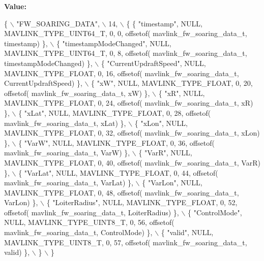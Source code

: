 {\bfseries Value\+:}
\begin{DoxyCode}
\{ \(\backslash\)
    \textcolor{stringliteral}{"FW\_SOARING\_DATA"}, \(\backslash\)
    14, \(\backslash\)
    \{  \{ \textcolor{stringliteral}{"timestamp"}, NULL, MAVLINK_TYPE_UINT64_T, 0, 0, offsetof(
      mavlink_fw_soaring_data_t, timestamp) \}, \(\backslash\)
         \{ \textcolor{stringliteral}{"timestampModeChanged"}, NULL, MAVLINK_TYPE_UINT64_T, 0, 8, offsetof(
      mavlink_fw_soaring_data_t, timestampModeChanged) \}, \(\backslash\)
         \{ \textcolor{stringliteral}{"CurrentUpdraftSpeed"}, NULL, MAVLINK_TYPE_FLOAT, 0, 16, offsetof(
      mavlink_fw_soaring_data_t, CurrentUpdraftSpeed) \}, \(\backslash\)
         \{ \textcolor{stringliteral}{"xW"}, NULL, MAVLINK_TYPE_FLOAT, 0, 20, offsetof(
      mavlink_fw_soaring_data_t, xW) \}, \(\backslash\)
         \{ \textcolor{stringliteral}{"xR"}, NULL, MAVLINK_TYPE_FLOAT, 0, 24, offsetof(
      mavlink_fw_soaring_data_t, xR) \}, \(\backslash\)
         \{ \textcolor{stringliteral}{"xLat"}, NULL, MAVLINK_TYPE_FLOAT, 0, 28, offsetof(
      mavlink_fw_soaring_data_t, xLat) \}, \(\backslash\)
         \{ \textcolor{stringliteral}{"xLon"}, NULL, MAVLINK_TYPE_FLOAT, 0, 32, offsetof(
      mavlink_fw_soaring_data_t, xLon) \}, \(\backslash\)
         \{ \textcolor{stringliteral}{"VarW"}, NULL, MAVLINK_TYPE_FLOAT, 0, 36, offsetof(
      mavlink_fw_soaring_data_t, VarW) \}, \(\backslash\)
         \{ \textcolor{stringliteral}{"VarR"}, NULL, MAVLINK_TYPE_FLOAT, 0, 40, offsetof(
      mavlink_fw_soaring_data_t, VarR) \}, \(\backslash\)
         \{ \textcolor{stringliteral}{"VarLat"}, NULL, MAVLINK_TYPE_FLOAT, 0, 44, offsetof(
      mavlink_fw_soaring_data_t, VarLat) \}, \(\backslash\)
         \{ \textcolor{stringliteral}{"VarLon"}, NULL, MAVLINK_TYPE_FLOAT, 0, 48, offsetof(
      mavlink_fw_soaring_data_t, VarLon) \}, \(\backslash\)
         \{ \textcolor{stringliteral}{"LoiterRadius"}, NULL, MAVLINK_TYPE_FLOAT, 0, 52, offsetof(
      mavlink_fw_soaring_data_t, LoiterRadius) \}, \(\backslash\)
         \{ \textcolor{stringliteral}{"ControlMode"}, NULL, MAVLINK_TYPE_UINT8_T, 0, 56, offsetof(
      mavlink_fw_soaring_data_t, ControlMode) \}, \(\backslash\)
         \{ \textcolor{stringliteral}{"valid"}, NULL, MAVLINK_TYPE_UINT8_T, 0, 57, offsetof(
      mavlink_fw_soaring_data_t, valid) \}, \(\backslash\)
         \} \(\backslash\)
\}
\end{DoxyCode}
\mbox{\label{mavlink__msg__fw__soaring__data_8h_adb73fa1d0b58f046faf1ee9cf11cbe48}} 
